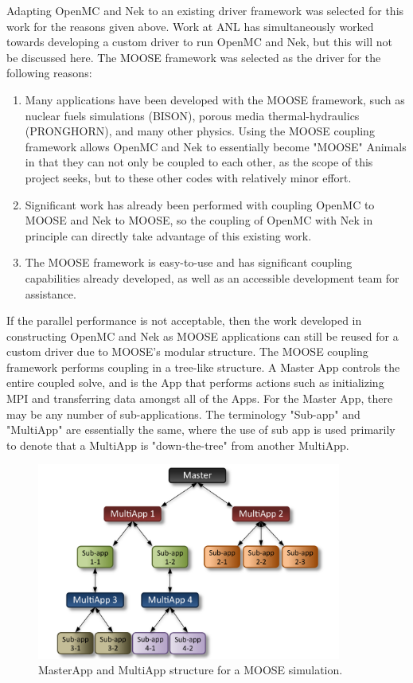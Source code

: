 \documentclass[10pt]{article}
\numberwithin{equation}{section} %
\begin{document}
Adapting OpenMC and Nek to an existing driver framework was selected for this work for the reasons given above. Work at ANL has simultaneously worked towards developing a custom driver to run OpenMC and Nek, but this will not be discussed here. The MOOSE framework was selected as the driver for the following reasons:

\begin{enumerate}
\item Many applications have been developed with the MOOSE framework, such as nuclear fuels simulations (BISON), porous media thermal-hydraulics (PRONGHORN), and many other physics. Using the MOOSE coupling framework allows OpenMC and Nek to essentially become "MOOSE" Animals in that they can not only be coupled to each other, as the scope of this project seeks, but to these other codes with relatively minor effort.
\item Significant work has already been performed with coupling OpenMC to MOOSE and Nek to MOOSE, so the coupling of OpenMC with Nek in principle can directly take advantage of this existing work.
\item The MOOSE framework is easy-to-use and has significant coupling capabilities already developed, as well as an accessible development team for assistance.
\end{enumerate}

If the parallel performance is not acceptable, then the work developed in constructing OpenMC and Nek as MOOSE applications can still be reused for a custom driver due to MOOSE's modular structure. The MOOSE coupling framework performs coupling in a tree-like structure. A Master App controls the entire coupled solve, and is the App that performs actions such as initializing MPI and transferring data amongst all of the Apps. For the Master App, there may be any number of sub-applications. The terminology "Sub-app" and "MultiApp" are essentially the same, where the use of sub app is used primarily to denote that a MultiApp is "down-the-tree" from another MultiApp. 

\begin{figure}[H]
\centering
\includegraphics[width=10cm]{figures/multiapp_hierarchy.png}
\caption{MasterApp and MultiApp structure for a MOOSE simulation.}
\end{figure}
\end{document}
